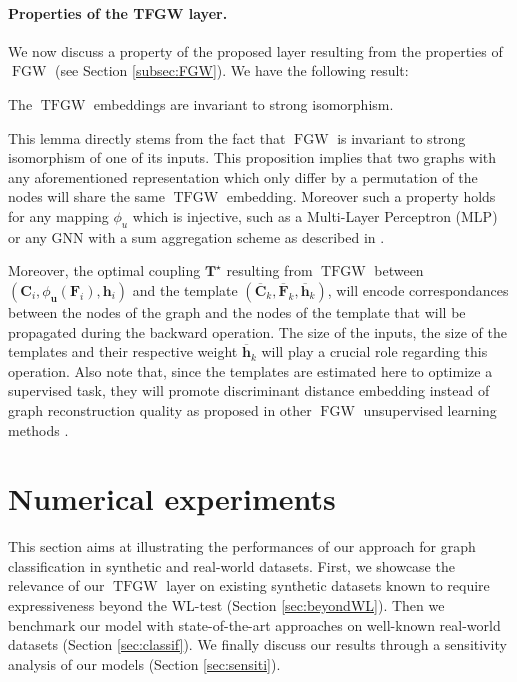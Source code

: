\documentclass{article}
\def\vh{{\bm{h}}}
\def\vu{{\bm{u}}}
\def\mC{{\bm{C}}}
\def\mF{{\bm{F}}}
\def\mT{{\bm{T}}}
\newcommand{\FGW}{\operatorname{FGW}}
\newcommand{\TFGW}{\operatorname{TFGW}}
\begin{document}
\paragraph{Properties of the TFGW layer.} We now discuss a property of the proposed layer 
resulting from the properties of $\FGW$ (see Section \ref{subsec:FGW}). We have the following result:
\begin{lemma}
	The $\TFGW$ embeddings are invariant to strong isomorphism.
\end{lemma}
This lemma directly stems from the fact that $\FGW$ is invariant to strong isomorphism of one of its inputs. This proposition implies that two graphs with any aforementioned representation which only differ by a permutation of the nodes will share the same $\TFGW$ embedding. 
Moreover such a property holds for any mapping $\phi_u$ which is
injective, such as a Multi-Layer Perceptron (MLP)
\cite{hornik1989multilayer} or any GNN with a sum aggregation scheme as described in \cite{xu2018powerful}. 

Moreover, the optimal coupling $\mT^{\star}$ resulting from $\TFGW$ between $(\mC_i,\phi_{\vu}(\mF_i), \vh_i)$ and the template $(\overline{\mC}_k,\overline{\mF}_k, \overline{\vh}_k)$, will encode correspondances between the nodes of the graph and the nodes of the template that will be propagated during the backward operation. The size of the inputs, the size of the templates and their respective weight $\overline{\vh}_k$ will play a crucial role regarding this operation.
Also note that, since the templates are estimated here to optimize a supervised task, they will promote discriminant distance embedding instead of graph reconstruction quality as proposed in other $\FGW$ unsupervised learning methods
\cite{vincent2021online, vincent-cuaz2022semirelaxed}.  








 	\label{sec:model}
	
	\section{Numerical experiments}
	



This section aims at illustrating the performances of our approach for graph classification in synthetic and real-world datasets. First, we showcase the relevance of our $\TFGW$ layer on existing synthetic datasets known to require expressiveness beyond the WL-test (Section \ref{sec:beyondWL}). Then we benchmark our model with state-of-the-art approaches on well-known real-world datasets (Section \ref{sec:classif}). We finally discuss our results through a sensitivity analysis of our models (Section \ref{sec:sensiti}).
\end{document}

